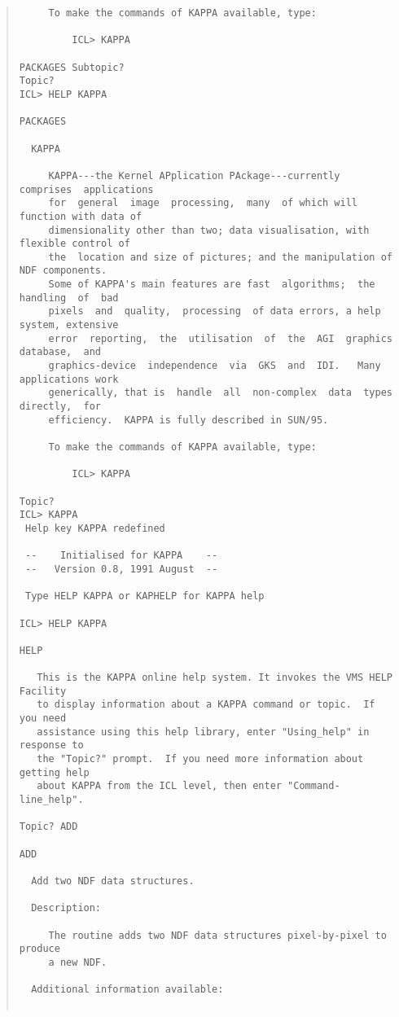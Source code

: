 \begin{quote}
\begin{verbatim}
     To make the commands of KAPPA available, type: 
  
         ICL> KAPPA 
  
PACKAGES Subtopic? 
Topic? 
ICL> HELP KAPPA 
  
PACKAGES 
  
  KAPPA 
  
     KAPPA---the Kernel APplication PAckage---currently  comprises  applications 
     for  general  image  processing,  many  of which will function with data of 
     dimensionality other than two; data visualisation, with flexible control of 
     the  location and size of pictures; and the manipulation of NDF components. 
     Some of KAPPA's main features are fast  algorithms;  the  handling  of  bad 
     pixels  and  quality,  processing  of data errors, a help system, extensive 
     error  reporting,  the  utilisation  of  the  AGI  graphics  database,  and 
     graphics-device  independence  via  GKS  and  IDI.   Many applications work 
     generically, that is  handle  all  non-complex  data  types  directly,  for 
     efficiency.  KAPPA is fully described in SUN/95. 
  
     To make the commands of KAPPA available, type: 
  
         ICL> KAPPA 
  
Topic? 
ICL> KAPPA 
 Help key KAPPA redefined 
 
 --    Initialised for KAPPA    -- 
 --   Version 0.8, 1991 August  -- 
 
 Type HELP KAPPA or KAPHELP for KAPPA help 
  
ICL> HELP KAPPA 
  
HELP 
 
   This is the KAPPA online help system. It invokes the VMS HELP Facility 
   to display information about a KAPPA command or topic.  If you need 
   assistance using this help library, enter "Using_help" in response to 
   the "Topic?" prompt.  If you need more information about getting help 
   about KAPPA from the ICL level, then enter "Command-line_help". 
 
Topic? ADD 
 
ADD 
  
  Add two NDF data structures. 
  
  Description: 
  
     The routine adds two NDF data structures pixel-by-pixel to produce 
     a new NDF. 
  
  Additional information available: 
  

\end{verbatim}
\end{quote}

